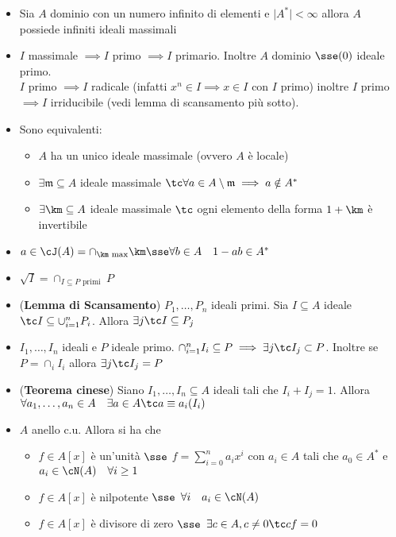 \documentclass[a4paper,NoNotes,GeneralMath]{stdmdoc}
\begin{document}
\begin{itemize}
		\item Sia $A$ dominio con un numero infinito di elementi e $\mid A^* \mid < \infty$ allora $A$ possiede infiniti ideali massimali
		\item $I$ massimale $\implies I$ primo $\implies I$ primario. Inoltre $A$ dominio $\sse (0)$ ideale primo. \\
			$I$ primo $\implies I$ radicale (infatti $x^n \in I \implies x \in I$ con $I$ primo) inoltre $I$ primo $\implies I$ irriducibile (vedi lemma di scansamento più sotto).
		\item Sono equivalenti:
			\begin{itemize}
				\item $A$ ha un unico ideale massimale (ovvero $A$ è locale)
				\item $\exists \mathfrak{m} \subseteq A$ ideale massimale $\tc \forall a \in A \setminus \mathfrak{m} \implies a \notin A^*$
				\item $\exists \km \subseteq A$ ideale massimale $\tc$ ogni elemento della forma $1 + \km$ è invertibile
			\end{itemize}
		\item $a \in \cJ(A) = \cap_{\km \text{ max}} \km \sse \forall b \in A \quad 1-ab \in A^*$
		\item $\sqrt{I} = \cap_{I \subseteq P \text{ primi }} P$
		\item ({\bf Lemma di Scansamento}) $P_1, \ldots, P_n$ ideali primi. Sia $I \subseteq A$ ideale $\tc I \subseteq \cup_{i=1}^n P_i$. Allora $\exists j \tc I \subseteq P_j$
		\item $I_1, \ldots, I_n$ ideali e $P$ ideale primo. $\cap_{i=1}^n I_i \subseteq P \implies \exists j \tc I_j \subset P$. Inoltre se $P = \cap_i I_i$ allora $\exists j \tc I_j = P$
		\item ({\bf Teorema cinese}) Siano $I_1, \ldots, I_n \subseteq A$ ideali tali che $I_i + I_j = 1$. Allora $\forall a_1, \ldots, a_n \in A \quad \exists a \in A \tc a \equiv a_i (I_i)$
		\item $A$ anello c.u. Allora si ha che
			\begin{itemize}
				\item $f \in A[x]$ è un'unità $\sse$ $f = \sum_{i=0}^n a_i x^i$ con $a_i \in A$ tali che $a_0 \in A^*$ e $a_i \in \cN(A) \quad \forall i \ge 1$
				\item $f \in A[x]$ è nilpotente $\sse$ $\forall i \quad a_i \in \cN(A)$
				\item $f \in A[x]$ è divisore di zero $\sse$ $\exists c \in A, c \neq 0 \tc cf = 0$

\end{itemize}
\end{itemize}
\end{document}
